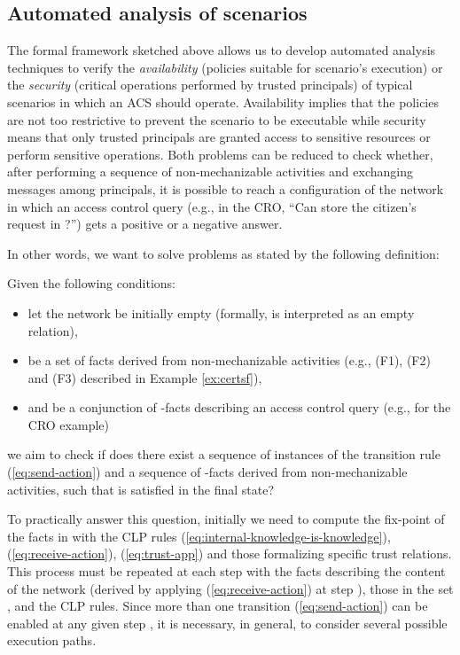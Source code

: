 \documentclass[conference]{llncs}
\newcommand{\CRO}{CRO}
\begin{document}
\subsection{Automated analysis of scenarios}
The formal framework sketched above allows us to develop automated analysis techniques to verify the \emph{availability} (policies suitable for scenario's execution) or the \emph{security}  (critical operations performed by trusted principals) of typical
scenarios in which an ACS should operate.  
Availability implies that
the policies are not too restrictive to prevent the scenario to be
executable while security means that only trusted principals are
granted access to sensitive resources or perform sensitive operations.
Both problems can be reduced to check whether, after performing a
sequence of non-mechanizable activities and exchanging messages among
principals, it is possible to reach a configuration of the network in
which an access control query (e.g., in the \CRO{}, ``Can  store
the citizen's request in ?'') gets a positive or a negative
answer.


In other words, we want to solve problems as stated by the following definition: 
\begin{definition} 
\label{def:reachprobs}
Given the following conditions:
\begin{itemize}
\item let the network be initially empty (formally,  is
interpreted as an empty relation),
\item   be a set of facts derived
from non-mechanizable activities (e.g., (F1), (F2) and (F3) described in Example \ref{ex:certsf}),	
\item and  be a conjunction of -facts
describing an access control query (e.g.,  for the \CRO{} example)
\end{itemize}
we aim to check if
does there exist a sequence of  instances of the transition rule
(\ref{eq:send-action}) and a sequence  of -facts
derived from non-mechanizable activities, such that  is satisfied in
the final state?
\end{definition}
To practically answer this question, initially we need to compute the fix-point of the facts in  with the CLP rules (\ref{eq:internal-knowledge-is-knowledge}),
(\ref{eq:receive-action}), (\ref{eq:trust-app}) and those formalizing
specific trust relations.  This process must be repeated at each step
 with the facts describing the content of the network
(derived by applying (\ref{eq:receive-action}) at step ), those
in the set , and the CLP rules.  Since more than one transition
(\ref{eq:send-action}) can be enabled at any given step , it is
necessary, in general, to consider several possible execution paths.
\end{document}
